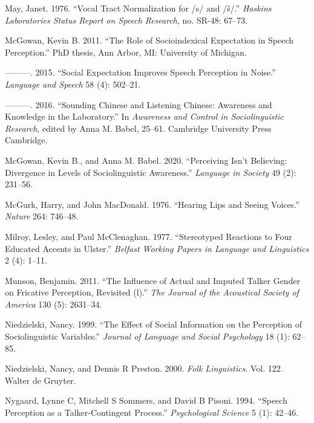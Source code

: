 \documentclass[
  letterpaper,
  DIV=11,
  numbers=noendperiod]{scrartcl}
\newlength{\cslhangindent}
\newenvironment{CSLReferences}[2] %
 {\begin{list}{}{%
  \setlength{\itemindent}{0pt}
  \setlength{\leftmargin}{0pt}
  \setlength{\parsep}{0pt}
  \ifodd #1
   \setlength{\leftmargin}{\cslhangindent}
   \setlength{\itemindent}{-1\cslhangindent}
  \fi
  \setlength{\itemsep}{#2\baselineskip}}}
 {\end{list}}
\begin{document}
\begin{CSLReferences}{1}{0}
May, Janet. 1976. {``Vocal Tract Normalization for /s/ and /š/.''}
\emph{Haskins Laboratories Status Report on Speech Research}, no. SR-48:
67--73.

McGowan, Kevin B. 2011. {``The Role of Socioindexical Expectation in
Speech Perception.''} PhD thesis, Ann Arbor, MI: University of Michigan.

---------. 2015. {``Social Expectation Improves Speech Perception in
Noise.''} \emph{Language and Speech} 58 (4): 502--21.

---------. 2016. {``Sounding Chinese and Listening Chinese: Awareness
and Knowledge in the Laboratory.''} In \emph{Awareness and Control in
Sociolinguistic Research}, edited by Anna M. Babel, 25--61. Cambridge
University Press Cambridge.

McGowan, Kevin B., and Anna M. Babel. 2020. {``Perceiving Isn't
Believing: Divergence in Levels of Sociolinguistic Awareness.''}
\emph{Language in Society} 49 (2): 231--56.

McGurk, Harry, and John MacDonald. 1976. {``Hearing Lips and Seeing
Voices.''} \emph{Nature} 264: 746--48.

Milroy, Lesley, and Paul McClenaghan. 1977. {``Stereotyped Reactions to
Four Educated Accents in Ulster.''} \emph{Belfast Working Papers in
Language and Linguistics} 2 (4): 1--11.

Munson, Benjamin. 2011. {``The Influence of Actual and Imputed Talker
Gender on Fricative Perception, Revisited (l).''} \emph{The Journal of
the Acoustical Society of America} 130 (5): 2631--34.

Niedzielski, Nancy. 1999. {``The Effect of Social Information on the
Perception of Sociolinguistic Variables.''} \emph{Journal of Language
and Social Psychology} 18 (1): 62--85.

Niedzielski, Nancy, and Dennis R Preston. 2000. \emph{Folk Linguistics}.
Vol. 122. Walter de Gruyter.

Nygaard, Lynne C, Mitchell S Sommers, and David B Pisoni. 1994.
{``Speech Perception as a Talker-Contingent Process.''}
\emph{Psychological Science} 5 (1): 42--46.


\end{CSLReferences}
\end{document}
